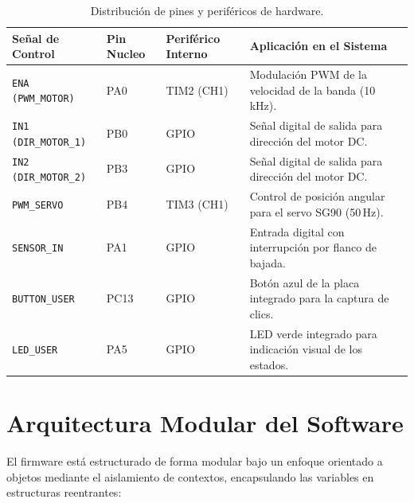 \documentclass[12pt, letterpaper]{article}
\begin{document}
\begin{table}[H]
\centering
\renewcommand{\arraystretch}{1.2}
\caption{Distribución de pines y periféricos de hardware.}
\label{tab:pines_perifericos}
\vspace{0.3cm}
\begin{tabularx}{\textwidth}{lXXX}
\toprule
\textbf{Señal de Control} & \textbf{Pin Nucleo} & \textbf{Periférico Interno} & \textbf{Aplicación en el Sistema} \\
\midrule
\texttt{ENA (PWM\_MOTOR)} & PA0 & TIM2 (CH1) & Modulación PWM de la velocidad de la banda (10\,kHz). \\
\midrule
\texttt{IN1 (DIR\_MOTOR\_1)} & PB0 & GPIO & Señal digital de salida para dirección del motor DC. \\
\midrule
\texttt{IN2 (DIR\_MOTOR\_2)} & PB3 & GPIO & Señal digital de salida para dirección del motor DC. \\
\midrule
\texttt{PWM\_SERVO} & PB4 & TIM3 (CH1) & Control de posición angular para el servo SG90 (50\,Hz). \\
\midrule
\texttt{SENSOR\_IN} & PA1 & GPIO & Entrada digital con interrupción por flanco de bajada. \\
\midrule
\texttt{BUTTON\_USER} & PC13 & GPIO & Botón azul de la placa integrado para la captura de clics. \\
\midrule
\texttt{LED\_USER} & PA5 & GPIO & LED verde integrado para indicación visual de los estados. \\
\bottomrule
\end{tabularx}
\end{table}

\clearpage

\section{Arquitectura Modular del Software}
\label{sec:arquitectura_software}

El firmware está estructurado de forma modular bajo un enfoque orientado a objetos mediante el aislamiento de contextos, encapsulando las variables en estructuras reentrantes:
\end{document}
